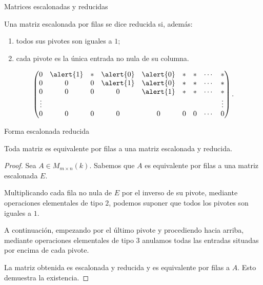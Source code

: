 \begin{frame}{Matrices escalonadas y reducidas}

\begin{definition}

Una matriz escalonada por filas se dice \alert{reducida} si, además:

\begin{enumerate}

    \item todos sus pivotes son iguales a \(1\);

    \item cada pivote es la única entrada no nula de su columna.
\end{enumerate}

\[
\begin{pmatrix}
0    & \alert{1}    & \ast & \alert{0}    & \alert{0}    & \ast & \ast & \cdots & \ast \\
0    & 0    & 0    & \alert{1}    & \alert{0}    & \ast & \ast & \cdots & \ast \\
0    & 0    & 0    & 0    & \alert{1}    & \ast & \ast & \cdots & \ast \\
\vdots &&&&&&&&\vdots \\
0    & 0    & 0    & 0    & 0    & 0    & 0    & \cdots & 0
\end{pmatrix}.
\]

\end{definition}

\end{frame}

\begin{frame}[allowframebreaks]{Forma escalonada reducida}

\begin{theorem}
Toda matriz es equivalente por filas a una matriz
escalonada y reducida.
\end{theorem}

\begin{proof}
Sea \(A\in M_{m\times n}(k)\). Sabemos que \(A\) es equivalente
por filas a una matriz escalonada \(E\).

Multiplicando cada fila no nula de \(E\) por el inverso de su pivote,
mediante operaciones elementales de tipo \(2\), podemos suponer que
todos los pivotes son iguales a \(1\).

A continuación, empezando por el último pivote y procediendo hacia
arriba, mediante operaciones elementales de tipo \(3\) anulamos
todas las entradas situadas por encima de cada pivote.

La matriz obtenida es escalonada y reducida y es equivalente por filas
a \(A\). Esto demuestra la existencia.
\end{proof}

\end{frame}


